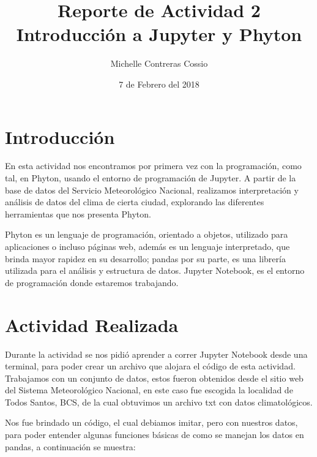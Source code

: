 \documentclass[a4paper]{article}
\title{Reporte de Actividad 2\\ Introducción a Jupyter y Phyton}
\author{Michelle Contreras Cossio}
\date{7 de Febrero del 2018}
\begin{document}
\maketitle


\section{Introducción}

En esta actividad nos encontramos por primera vez con la programación, como tal, en Phyton, usando el entorno de programación de Jupyter. A partir de la base de datos del Servicio Meteorológico Nacional, realizamos interpretación y análisis de datos del clima de cierta ciudad, explorando las diferentes herramientas que nos presenta Phyton. 

Phyton es un lenguaje de programación, orientado a objetos, utilizado para aplicaciones o incluso páginas web, además es un lenguaje interpretado, que brinda mayor rapidez en su desarrollo; pandas por su parte, es una librería utilizada para el análisis y estructura de datos. Jupyter Notebook, es el entorno de programación donde estaremos trabajando. 



\section{Actividad Realizada}

Durante la actividad se nos pidió aprender a correr Jupyter Notebook desde una terminal, para poder crear un archivo que alojara el código de esta actividad. Trabajamos con un conjunto de datos, estos fueron obtenidos desde el sitio web del Sistema Meteorológico Nacional, en este caso fue escogida la localidad de Todos Santos, BCS, de la cual obtuvimos un archivo txt con datos climatológicos. 

Nos fue brindado un código, el cual debiamos imitar, pero con nuestros datos, para poder entender algunas funciones básicas de como se manejan los datos en pandas, a continuación se muestra:
\end{document}
